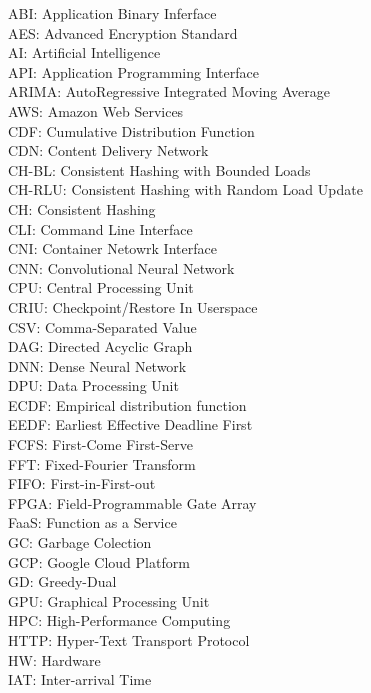 ABI: Application Binary Inferface \\
AES: Advanced Encryption Standard \\
AI: Artificial Intelligence \\
API: Application Programming Interface \\
ARIMA: AutoRegressive Integrated Moving Average \\
AWS: Amazon Web Services \\
CDF: Cumulative Distribution Function \\
CDN: Content Delivery Network \\
CH-BL: Consistent Hashing with Bounded Loads \\
CH-RLU: Consistent Hashing with Random Load Update \\
CH: Consistent Hashing \\
CLI: Command Line Interface \\
CNI: Container Netowrk Interface \\
CNN: Convolutional Neural Network \\
CPU: Central Processing Unit \\
CRIU: Checkpoint/Restore In Userspace \\
CSV: Comma-Separated Value \\
DAG: Directed Acyclic Graph \\
DNN: Dense Neural Network \\
DPU: Data Processing Unit \\
ECDF: Empirical distribution function \\
EEDF: Earliest Effective Deadline First \\
FCFS: First-Come First-Serve \\
FFT: Fixed-Fourier Transform \\
FIFO: First-in-First-out \\
FPGA: Field-Programmable Gate Array \\
FaaS: Function as a Service \\
GC: Garbage Colection \\
GCP: Google Cloud Platform \\
GD: Greedy-Dual \\
GPU: Graphical Processing Unit \\
HPC: High-Performance Computing \\
HTTP: Hyper-Text Transport Protocol \\
HW: Hardware \\
IAT: Inter-arrival Time \\
